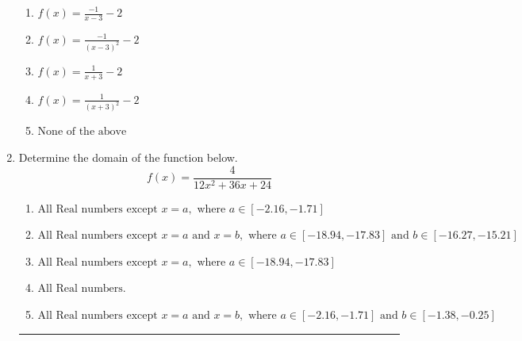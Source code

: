 \documentclass[14pt]{extbook}
\newcommand{\litem}[1]{\item#1\hspace*{-1cm}\rule{\textwidth}{0.4pt}}
\begin{document}
\begin{enumerate}
{\begin{center}
\end{center}
\begin{enumerate}[label=\Alph*.]
\item \( f(x) = \frac{-1}{x - 3} - 2 \)
\item \( f(x) = \frac{-1}{(x - 3)^2} - 2 \)
\item \( f(x) = \frac{1}{x + 3} - 2 \)
\item \( f(x) = \frac{1}{(x + 3)^2} - 2 \)
\item \( \text{None of the above} \)

\end{enumerate} }
\litem{
Determine the domain of the function below.\[ f(x) = \frac{4}{12x^{2} +36 x + 24} \]\begin{enumerate}[label=\Alph*.]
\item \( \text{All Real numbers except } x = a, \text{ where } a \in [-2.16, -1.71] \)
\item \( \text{All Real numbers except } x = a \text{ and } x = b, \text{ where } a \in [-18.94, -17.83] \text{ and } b \in [-16.27, -15.21] \)
\item \( \text{All Real numbers except } x = a, \text{ where } a \in [-18.94, -17.83] \)
\item \( \text{All Real numbers.} \)
\item \( \text{All Real numbers except } x = a \text{ and } x = b, \text{ where } a \in [-2.16, -1.71] \text{ and } b \in [-1.38, -0.25] \)

\end{enumerate} }
\end{enumerate}
\end{document}
